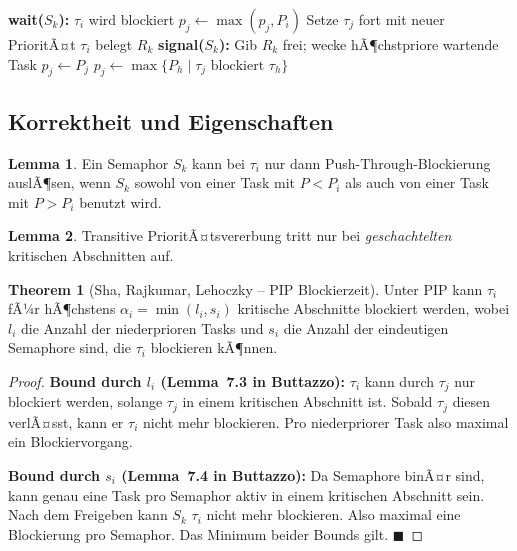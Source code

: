 ﻿\documentclass[a4paper,12pt]{report}
\theoremstyle{definition}
\newtheorem{lemma}{Lemma}[chapter]
\newtheorem{theorem}{Theorem}[chapter]
\begin{document}
\begin{algorithm}[H]
	\caption{Priority Inheritance Protocol (PIP)}
	\begin{algorithmic}[1]
		\State \textbf{wait($S_k$):}
		\State $\tau_i$ wird blockiert
		\State $p_j \leftarrow \max(p_j, P_i)$ 
		\State Setze $\tau_j$ fort mit neuer PrioritÃ¤t
		\Else
		\State $\tau_i$ belegt $R_k$
		\EndIf
		\State
		\State \textbf{signal($S_k$):}
		\State Gib $R_k$ frei; wecke hÃ¶chstpriore wartende Task
		\State $p_j \leftarrow P_j$ 
		\Else
		\State $p_j \leftarrow \max\{P_h \mid \tau_j \text{ blockiert } \tau_h\}$
		\EndIf
	\end{algorithmic}
\end{algorithm}

\subsection{Korrektheit und Eigenschaften}

\begin{lemma}
	Ein Semaphor $S_k$ kann bei $\tau_i$ nur dann Push-Through-Blockierung
	auslÃ¶sen, wenn $S_k$ sowohl von einer Task mit $P < P_i$ als auch von einer
	Task mit $P > P_i$ benutzt wird.
\end{lemma}

\begin{lemma}
	Transitive PrioritÃ¤tsvererbung tritt nur bei \emph{geschachtelten}
	kritischen Abschnitten auf.
\end{lemma}

\begin{theorem}[Sha, Rajkumar, Lehoczky -- PIP Blockierzeit]
	\label{thm:pip}
	Unter PIP kann $\tau_i$ fÃ¼r hÃ¶chstens $\alpha_i = \min(l_i, s_i)$ kritische
	Abschnitte blockiert werden, wobei $l_i$ die Anzahl der niederprioren Tasks
	und $s_i$ die Anzahl der eindeutigen Semaphore sind, die $\tau_i$ blockieren
	kÃ¶nnen.
\end{theorem}

\begin{proof}
	\textbf{Bound durch $l_i$ (Lemma~7.3 in Buttazzo):} $\tau_i$ kann durch
	$\tau_j$ nur blockiert werden, solange $\tau_j$ in einem kritischen Abschnitt
	ist. Sobald $\tau_j$ diesen verlÃ¤sst, kann er $\tau_i$ nicht mehr blockieren.
	Pro niederpriorer Task also maximal ein Blockiervorgang.

	\textbf{Bound durch $s_i$ (Lemma~7.4 in Buttazzo):} Da Semaphore binÃ¤r sind,
	kann genau eine Task pro Semaphor aktiv in einem kritischen Abschnitt sein.
	Nach dem Freigeben kann $S_k$ $\tau_i$ nicht mehr blockieren. Also maximal
	eine Blockierung pro Semaphor. Das Minimum beider Bounds gilt. \hfill$\blacksquare$
\end{proof}
\end{document}
